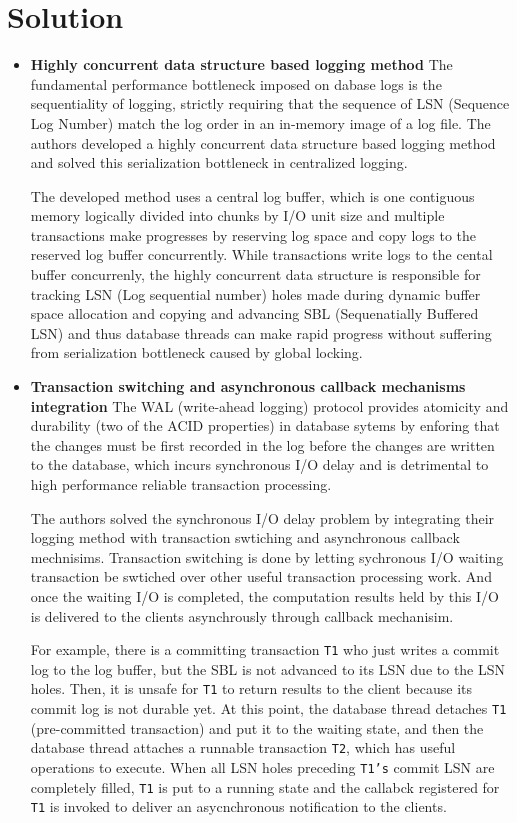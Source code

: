 \documentclass[10pt]{proc}
\begin{document}
  \section{Solution}
    \begin{itemize}
  	\item \textbf{Highly concurrent data structure based logging method}
  	  The fundamental performance bottleneck imposed on dabase logs is the sequentiality of logging, strictly requiring that the sequence of 
	  LSN (Sequence Log Number) match the log order in an in-memory image of a log file. The authors developed a highly concurrent data structure based logging method and solved this serialization bottleneck in centralized logging.
  	 
  	 The developed method uses a central log buffer, which is one contiguous memory logically divided into chunks by I/O unit size and multiple transactions make progresses by reserving log space and copy logs to the reserved log buffer concurrently. While transactions write logs to the cental buffer concurrenly, the highly concurrent data structure is responsible for tracking LSN (Log sequential number) holes made during dynamic buffer space allocation and copying and advancing SBL (Sequenatially Buffered LSN) and thus database threads can make rapid progress without suffering from  serialization bottleneck caused by global locking.

  	 \item \textbf{Transaction switching and asynchronous callback mechanisms integration}
  	The WAL (write-ahead logging) protocol provides atomicity and durability (two of the ACID properties) in database sytems by enforing that the changes must be first recorded in the log before the changes are written to the database, which incurs synchronous I/O delay and is detrimental to high performance reliable transaction processing.
  	
  	The authors solved the synchronous I/O delay problem by integrating their logging method with transaction swtiching and asynchronous callback mechnisims. Transaction switching is done by letting sychronous I/O waiting transaction be swtiched over other useful transaction processing work. And once the waiting I/O is completed, the computation results held by this I/O is delivered to the clients asynchrously through callback mechanisim.
  	
  	For example, there is a committing transaction \texttt{T1} who just writes a commit log to the log buffer, but the SBL is not advanced to its LSN due to the LSN holes. Then, it is unsafe for \texttt{T1} to return results to the client because its commit log is not durable yet. At this point, the database thread detaches \texttt{T1}  (pre-committed transaction) and put it to the waiting state, and then the database thread attaches a runnable transaction \texttt{T2}, which has useful operations to execute. When all LSN holes preceding \texttt{T1's}  commit LSN are completely filled, \texttt{T1} is put to a running state and the callabck registered for \texttt{T1} is invoked to deliver an asycnchronous notification to the clients.
  	 
  \end{itemize}
\end{document}

